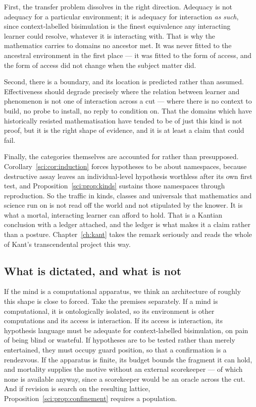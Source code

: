 First, the transfer problem dissolves in the right direction. Adequacy is not adequacy for a particular
environment; it is adequacy for interaction \emph{as such}, since context-labelled bisimulation is the
finest equivalence any interacting learner could resolve, whatever it is interacting with. That is why
the mathematics carries to domains no ancestor met. It was never fitted to the ancestral environment
in the first place --- it was fitted to the form of access, and the form of access did not change when
the subject matter did.

Second, there is a boundary, and its location is predicted rather than assumed. Effectiveness should
degrade precisely where the relation between learner and phenomenon is not one of interaction across a
cut --- where there is no context to build, no probe to install, no reply to condition on. That the
domains which have historically resisted mathematisation have tended to be of just this kind is not
proof, but it is the right shape of evidence, and it is at least a claim that could fail.

Finally, the categories themselves are accounted for rather than presupposed.
Corollary~\ref{sci:cor:induction} forces hypotheses to be about namespaces, because destructive assay
leaves an individual-level hypothesis worthless after its own first test, and
Proposition~\ref{sci:prop:kinds} sustains those namespaces through reproduction. So the traffic in kinds,
classes and universals that mathematics and science run on is not read off the world and not stipulated
by the knower. It is what a mortal, interacting learner can afford to hold. That is a Kantian
conclusion with a ledger attached, and the ledger is what makes it a claim rather than a posture.
Chapter~\ref{ch:kant} takes the remark seriously and reads the whole of Kant's transcendental
project this way.

\subsection{What is dictated, and what is not}\label{sci:S17.4}

If the mind is a computational apparatus, we think an architecture of roughly this shape is close to
forced. Take the premises separately. If a mind is computational, it is ontologically isolated, so its
environment is other computations and its access is interaction. If its access is interaction, its
hypothesis language must be adequate for context-labelled bisimulation, on pain of being blind or
wasteful. If hypotheses are to be tested rather than merely entertained, they must occupy guard
position, so that a confirmation is a rendezvous. If the apparatus is finite, its budget bounds the
fragment it can hold, and mortality supplies the motive without an external scorekeeper --- of which
none is available anyway, since a scorekeeper would be an oracle across the cut. And if revision is
search on the resulting lattice, Proposition~\ref{sci:prop:confinement} requires a population.

